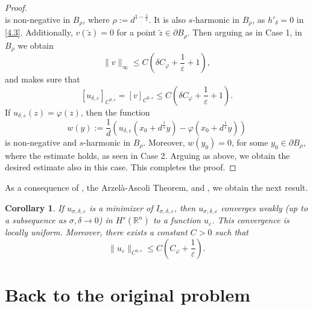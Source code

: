 \documentclass[11pt, reqno]{amsart}
\newtheorem{corollary}{Corollary}
\numberwithin{equation}{section}
\numberwithin{theorem}{section}
\numberwithin{lemma}{section}
\numberwithin{corollary}{section}
\numberwithin{remark}{section}
\numberwithin{proposition}{section}
\numberwithin{definition}{section}
\newcommand{\R}{\mathbb{R}}
\begin{document}
\begin{proof}
$$	$$
	is non-negative in $B_\rho$, where $\rho:=d^{1-\frac{1}{s}}$. It is also $s$-harmonic in $B_\rho$, as $h'_\delta=0$ in \eqref{4.3}. Additionally, $v(\tilde{z})=0$ for a point $\tilde{z}\in\partial B_\rho$. Then arguing as in Case 1, in $B_{\rho}$ we obtain
	$$
	\|v\|_\infty\le C\left(\delta C_\varphi+\frac{1}{\varepsilon}+1\right),
	$$
	and   makes sure that
	$$	\left[u_{\delta,\varepsilon}\right]_{C^{0,s}}=\left[v\right]_{C^{0,s}}\le C\left(\delta C_\varphi+\frac{1}{\varepsilon}+1\right).
	$$
	If $u_{\delta,\varepsilon}(z)=\varphi(z)$, then the function
	$$
	w(y):=\frac{1}{d}\left(u_{\delta,\varepsilon}(x_0+d^{\frac{1}{s}}y)-\varphi(x_0+d^{\frac{1}{s}}y)\right)
	$$
	is non-negative and $s$-harmonic in $B_\rho$. Moreover, $w(y_0)=0$, for some $y_0\in\partial B_\rho$, where the estimate holds, as seen in Case 2. Arguing as above, we obtain the desired estimate also in this case. This completes the proof.	
\end{proof}
As a consequence of , the Arzel\`a-Ascoli Theorem, and , we obtain the next result.
\begin{corollary}\label{c4.2}
	If $u_{\sigma,\delta,\varepsilon}$ is a minimizer of $I_{\sigma,\delta,\varepsilon}$, then $u_{\sigma,\delta,\varepsilon}$ converges weakly (up to a subsequence as $\sigma,\delta\rightarrow0$) in $H^s(\R^n)$ to a function $u_\varepsilon$. This convergence is locally uniform. Moreover, there exists a constant $C>0$ such that
	$$
	\|u_\varepsilon\|_{C^{0,s}}\le C\left(C_\varphi+	\frac{1}{\varepsilon}\right).
	$$
\end{corollary}

\smallskip

\section{Back to the original problem}\label{s5}
\end{document}
